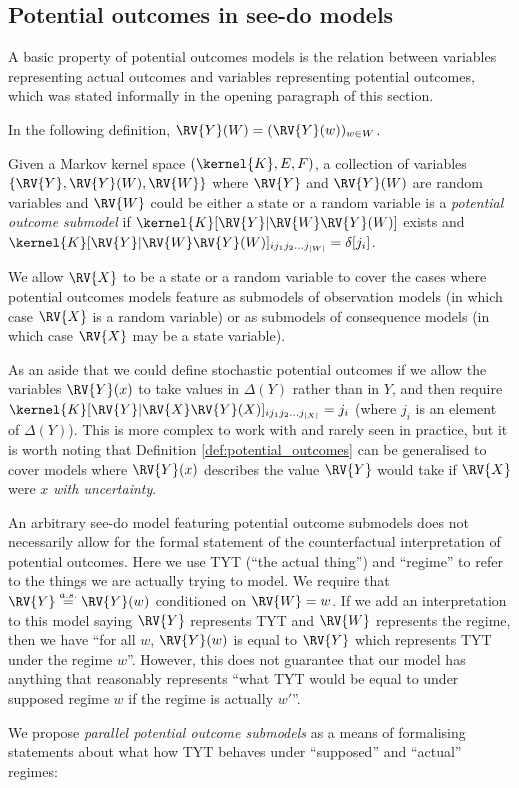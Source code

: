 \subsection{Potential outcomes in see-do models}

A basic property of potential outcomes models is the relation between variables representing actual outcomes and variables representing potential outcomes, which was stated informally in the opening paragraph of this section.

In the following definition, $\RV{Y}(W)=(\RV{Y}(w))_{w\in W}$.

\begin{definition}\label{def:potential_outcomes}
Given a Markov kernel space $(\kernel{K},E,F)$, a collection of variables $\{\RV{Y}, \RV{Y}(W), \RV{W}\}$ where $\RV{Y}$ and $\RV{Y}(W)$ are random variables and $\RV{W}$ could be either a state or a random variable is a \emph{potential outcome submodel} if $\kernel{K}[\RV{Y}|\RV{W}\RV{Y}(W)]$ exists and $\kernel{K}[\RV{Y}|\RV{W}\RV{Y}(W)]_{i j_1 j_2 ... j_{|W|}} = \delta[j_i]$. 
\end{definition}


We allow $\RV{X}$ to be a state or a random variable to cover the cases where potential outcomes models feature as submodels of observation models (in which case $\RV{X}$ is a random variable) or as submodels of consequence models (in which case $\RV{X}$ may be a state variable).

As an aside that we could define stochastic potential outcomes if we allow the variables $\RV{Y}(x)$ to take values in $\Delta(Y)$ rather than in $Y$, and then require $\kernel{K}[\RV{Y}|\RV{X}\RV{Y}(X)]_{i j_1 j_2 ... j_{|X|}} = j_i$ (where $j_i$ is an element of $\Delta(Y)$). This is more complex to work with and rarely seen in practice, but it is worth noting that Definition \ref{def:potential_outcomes} can be generalised to cover models where $\RV{Y}(x)$ describes the value $\RV{Y}$ would take if $\RV{X}$ were $x$ \emph{with uncertainty}.

An arbitrary see-do model featuring potential outcome submodels does not necessarily allow for the formal statement of the counterfactual interpretation of potential outcomes. Here we use TYT (``the actual thing'') and ``regime'' to refer to the things we are actually trying to model. We require that $\RV{Y}\overset{a.s.}{=}\RV{Y}(w)$ conditioned on $\RV{W}=w$. If we add an interpretation to this model saying $\RV{Y}$ represents TYT and $\RV{W}$ represents the regime, then we have ``for all $w$, $\RV{Y}(w)$ is equal to $\RV{Y}$ which represents TYT under the regime $w$''. However, this does not guarantee that our model has anything that reasonably represents ``what TYT would be equal to under supposed regime $w$ if the regime is actually $w'$''.

We propose \emph{parallel potential outcome submodels} as a means of formalising statements about what how TYT behaves under ``supposed'' and ``actual'' regimes:
